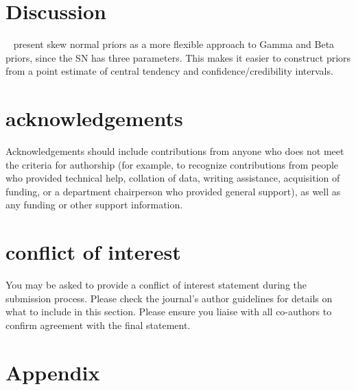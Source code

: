 \documentclass[alpha-refs]{wiley-article}
\begin{document}
\section*{Discussion}

~\citep{Weidemann2014} present skew normal priors as a more flexible approach to Gamma and Beta priors, since the SN has three parameters.
This makes it easier to construct priors from a point estimate of central tendency and confidence/credibility intervals.

\section*{acknowledgements}
Acknowledgements should include contributions from anyone who does not meet the criteria for authorship (for example, to recognize contributions from people who provided technical help, collation of data, writing assistance, acquisition of funding, or a department chairperson who provided general support), as well as any funding or other support information.

\section*{conflict of interest}
You may be asked to provide a conflict of interest statement during the submission process. Please check the journal's author guidelines for details on what to include in this section. Please ensure you liaise with all co-authors to confirm agreement with the final statement.


\section{Appendix}
\end{document}
